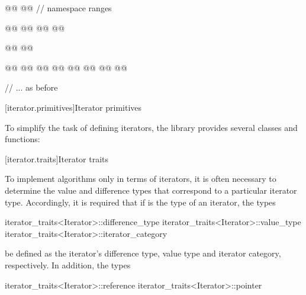 \begin{codeblock}
{{    @@
      @@
  } // namespace ranges

  @@
  @@
  @@
  @@

  @@
  @@

  @@
  @@
    @@
  @@
    @@
  @@
      @@
    @@
  
  // ... as before
}
\end{codeblock}


[iterator.primitives]{Iterator primitives}

\pnum
To simplify the task of defining iterators, the library provides
several classes and functions:

[iterator.traits]{Iterator traits}


\pnum
{}%
To implement algorithms only in terms of iterators, it is often necessary to
determine the value and
difference types that correspond to a particular iterator type.
Accordingly, it is required that if
is the type of an iterator,
the types

%
%
%
\begin{codeblock}
iterator_traits<Iterator>::difference_type
iterator_traits<Iterator>::value_type
iterator_traits<Iterator>::iterator_category
\end{codeblock}

be defined as the iterator's difference type, value type and iterator category, respectively.
In addition, the types

%
%
\begin{codeblock}
iterator_traits<Iterator>::reference
iterator_traits<Iterator>::pointer
\end{codeblock}

